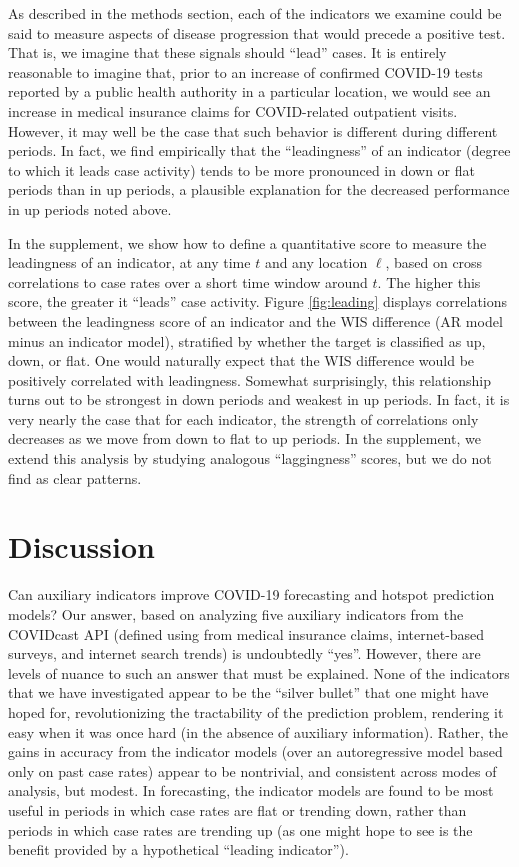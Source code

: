 \documentclass[9pt,twocolumn,twoside,lineno]{pnas-new}
\begin{document}
As described in the methods section, each of the indicators we examine could be
said to measure aspects of disease progression that would precede a positive
test. That is, we imagine that these signals should ``lead'' cases. It is
entirely reasonable to imagine that, prior to an increase of confirmed COVID-19
tests reported by a public health authority in a particular location, we would
see an increase in medical insurance claims for COVID-related outpatient
visits. However, it may well be the case that such behavior is different
during different periods. In fact, we find empirically that the ``leadingness''
of an indicator (degree to which it leads case activity) tends to be more
pronounced in down or flat periods than in up periods, a plausible explanation 
for the decreased performance in up periods noted above.

In the supplement, we show how to define a quantitative score to measure the
leadingness of an indicator, at any time $t$ and any location $\ell$, based on
cross correlations to case rates over a short time window around $t$.
The higher this score, the greater it ``leads'' case activity.  Figure 
\ref{fig:leading} displays correlations between the leadingness score of an 
indicator and the WIS difference (AR model minus an indicator model), stratified
by whether the target is classified as up, down, or flat.  One would naturally
expect that the WIS difference would be positively correlated with leadingness.
Somewhat surprisingly, this relationship turns out to be strongest in down
periods and weakest in up periods.  In fact, it is very nearly the case that for
each indicator, the strength of correlations only decreases as we move from down
to flat to up  periods.  In the supplement, we extend this analysis by studying 
analogous ``laggingness'' scores, but we do not find as clear patterns. 

\section{Discussion}

Can auxiliary indicators improve COVID-19 forecasting and hotspot prediction
models?  Our answer, based on analyzing five auxiliary indicators from the
COVIDcast API (defined using from medical insurance claims, internet-based
surveys, and internet search trends) is undoubtedly ``yes''. However, there are
levels of nuance to such an answer that must be explained.  None of the
indicators that we have investigated appear to be the ``silver bullet'' that one
might have hoped for, revolutionizing the tractability of the prediction
problem, rendering it easy when it was once hard (in the absence of auxiliary
information).  Rather, the gains in accuracy from the indicator models (over an
autoregressive model based only on past case rates) appear to be nontrivial, and
consistent across modes of analysis, but modest.  In forecasting, the indicator
models are found to be most useful in periods in which case rates are flat or
trending down, rather than periods in which case rates are trending up (as one
might hope to see is the benefit provided by a hypothetical ``leading
indicator'').
\end{document}
